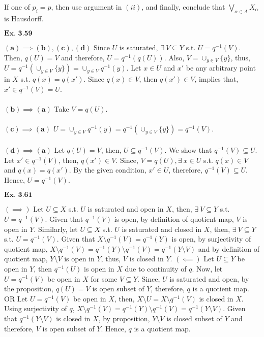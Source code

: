 \documentclass{article}
\begin{document}
If one of $p_i = p$, then use argument in $(ii)$, and finally, conclude that $\bigvee_{\alpha \in A} X_{\alpha}$ is Hausdorff.

\vspace{0.2in}

${\textbf{Ex. 3.59}}$

$\mathbf{(a)} \implies \mathbf{(b),(c),(d)}$ Since $U$ is saturated, $\exists\ V \subseteq Y$ s.t. $U = q^{-1}(V)$. Then, $q(U) = V$ and therefore, $U = q^{-1}(q(U))$. Also, $V = \cup_{y \in V}\{y\}$, thus, $U = q^{-1}(\cup_{y \in V}\{y\}) = \cup_{y\in V}q^{-1}(y)$. Let $x \in U$ and $x'$ be any arbitrary point in $X$ s.t. $q(x) = q(x')$. Since $q(x) \in V$, then $q(x') \in V$, implies that, $x'\in q^{-1}(V) = U$.\\~\\

$\mathbf{(b)} \implies \mathbf{(a)}$ Take $V = q(U)$.\\~\\

$\mathbf{(c)} \implies \mathbf{(a)}$ $U = \cup_{y \in V}q^{-1}(y) = q^{-1}(\cup_{y \in V}\{y\}) = q^{-1}(V)$.\\~\\

$\mathbf{(d)} \implies \mathbf{(a)}$ Let $q(U) = V$, then, $U \subseteq q^{-1}(V)$. We show that $q^{-1}(V) \subseteq U$. Let $x' \in q^{-1}(V)$, then, $q(x') \in V$. Since, $V = q(U), \exists\ x \in U$ s.t. $q(x) \in V$ and $q(x) = q(x')$. By the given condition, $x' \in U$, therefore, $q^{-1}(V) \subseteq U$. Hence, $U = q^{-1}(V)$.

\vspace{0.2in}

${\textbf{Ex. 3.61}}$

$(\implies)$ Let $U \subseteq X$ s.t. $U$ is saturated and open in $X$, then, $\exists\ V \subseteq Y$ s.t. $U = q^{-1}(V)$. Given that $q^{-1}(V)$ is open, by definition of quotient map, $V$ is open in $Y$. Similarly, let $U \subseteq X$ s.t. $U$ is saturated and closed in $X$, then, $\exists\ V \subseteq Y$ s.t. $U = q^{-1}(V)$. Given that $X\setminus q^{-1}(V) = q^{-1}(Y)$ is open, by surjectivity of quotient map, $X\setminus q^{-1}(V) = q^{-1}(Y) \setminus q^{-1}(V) = q^{-1}(Y\setminus V)$ and by definition of quotient map, $Y\setminus V$ is open in $Y$, thus, $V$ is closed in $Y$. $(\impliedby)$ Let $U \subseteq Y$ be open in $Y$, then $q^{-1}(U)$ is open in $X$ due to continuity of $q$. Now, let $U=q^{-1}(V)$ be open in $X$ for some $V\subseteq Y$. Since, $U$ is saturated and open, by the proposition, $q(U) = V$ is open subset of $Y$, therefore, $q$ is a quotient map. OR Let $U = q^{-1}(V)$ be open in $X$, then, $X\setminus U = X \setminus q^{-1}(V)$ is closed in $X$. Using surjectivity of $q$, $X \setminus q^{-1}(V) = q^{-1}(Y) \setminus q^{-1}(V) = q^{-1}(Y\setminus V)$. Given that $q^{-1}(Y\setminus V)$ is closed in $X$, by proposition, $Y\setminus V$ is closed subset of $Y$ and therefore, $V$ is open subset of $Y$. Hence, $q$ is a quotient map.
\end{document}
